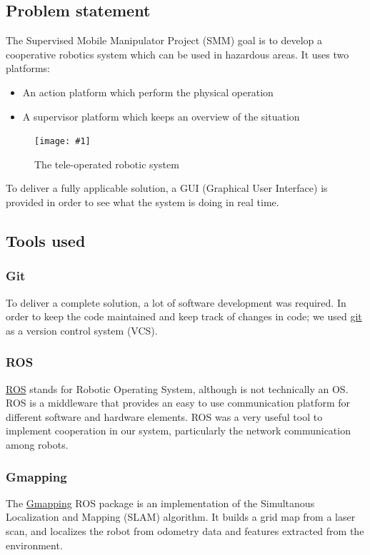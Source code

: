 \documentclass[11pt,a4paper,twocolumn]{article}
\newcommand{\centerFigure}[2]{
\begin{figure}[ht]	
\centering
\texttt{[image: \#1]}
\caption{#2}
\end{figure}
}
\begin{document}
\subsection{Problem statement}
The Supervised Mobile Manipulator Project (SMM) goal is to develop a cooperative robotics
system which can be used in hazardous areas. It uses two platforms: 

\begin{itemize}
\item An action platform which perform the physical operation
\item A supervisor platform which keeps an overview of the situation
\end{itemize}

\centerFigure{teleopSystem.png}{The tele-operated robotic system}

To deliver a fully applicable solution, a GUI (Graphical User Interface) is provided in
order to see what the system is doing in real time.


\subsection{Tools used}
\subsubsection{Git}
To deliver a complete solution, a lot of software development was required. In order to keep
the code maintained and keep track of changes in code; we used \href{https://git-scm.com/}{git} as a version control system
 (VCS).

\subsubsection{ROS}
\href{http://www.ros.org}{ROS} stands for Robotic Operating System, although is not technically an OS. ROS is a middleware that provides an easy to use communication platform for different software and hardware elements. ROS was a very useful tool to implement cooperation in our system, particularly the network communication among robots.

\subsubsection{Gmapping}
The \href{http://wiki.ros.org/gmapping}{Gmapping} ROS package is an implementation of the Simultanous Localization and Mapping (SLAM) algorithm. It builds a grid map from a laser scan, and localizes the robot from odometry data and features extracted from the environment.
\end{document}
